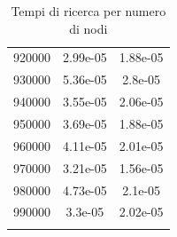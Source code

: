 \documentclass{article}
\begin{document}
\begin{longtable}{c|c|c}
           920000 &               2.99e-05 &               1.88e-05 \\
           930000 &               5.36e-05 &               2.8e-05  \\
           940000 &               3.55e-05 &               2.06e-05 \\
           950000 &               3.69e-05 &               1.88e-05 \\
           960000 &               4.11e-05 &               2.01e-05 \\
           970000 &               3.21e-05 &               1.56e-05 \\
           980000 &               4.73e-05 &               2.1e-05  \\
           990000 &               3.3e-05  &               2.02e-05 \\
\hline
\caption{Tempi di ricerca per numero di nodi}
\end{longtable}

\newpage
\end{document}
